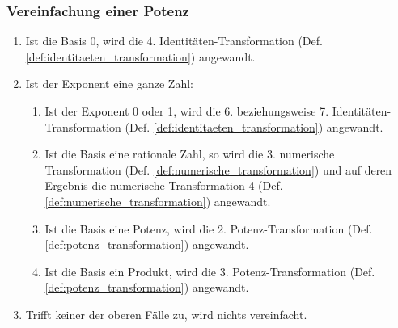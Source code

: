 \documentclass[11pt]{article}
\newcommand{\lab}[1]{(Def. \ref{#1})}
\begin{document}
\subsubsection{Vereinfachung einer Potenz}
\begin{enumerate}
  \item Ist die Basis 0, wird die 4. Identitäten-Transformation \lab{def:identitaeten_transformation} angewandt.
  \item Ist der Exponent eine ganze Zahl:
        \begin{enumerate}
          \item Ist der Exponent 0 oder 1, wird die 6. beziehungsweise 7. Identitäten-Transformation
                \lab{def:identitaeten_transformation} angewandt.
          \item Ist die Basis eine rationale Zahl, so wird die 3. numerische Transformation
                \lab{def:numerische_transformation} und auf deren Ergebnis die numerische 
                Transformation 4 \lab{def:numerische_transformation} angewandt.
          \item Ist die Basis eine Potenz, wird die 2. Potenz-Transformation \lab{def:potenz_transformation} angewandt.
          \item Ist die Basis ein Produkt, wird die 3. Potenz-Transformation \lab{def:potenz_transformation} angewandt.
        \end{enumerate}
  \item Trifft keiner der oberen Fälle zu, wird nichts vereinfacht.
\end{enumerate}
\end{document}
